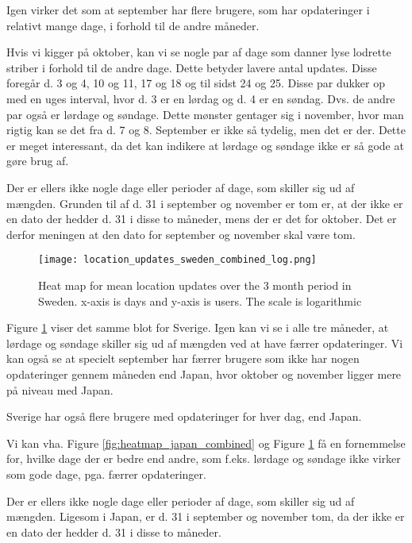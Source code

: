 Igen virker det som at september har flere brugere, som har opdateringer i relativt mange dage, i forhold til de andre måneder.

Hvis vi kigger på oktober, kan vi se nogle par af dage som danner lyse lodrette striber i forhold til de andre dage. Dette betyder lavere antal updates. Disse foregår d. 3 og 4, 10 og 11, 17 og 18 og til sidst 24 og 25. Disse par dukker op med en uges interval, hvor d. 3 er en lørdag og d. 4 er en søndag. Dvs. de andre par også er lørdage og søndage. Dette mønster gentager sig i november, hvor man rigtig kan se det fra d. 7 og 8. September er ikke så tydelig, men det er der. Dette er meget interessant, da det kan indikere at lørdage og søndage ikke er så gode at gøre brug af. 

Der er ellers ikke nogle dage eller perioder af dage, som skiller sig ud af mængden. Grunden til af d. 31 i september og november er tom er, at der ikke er en dato der hedder d. 31 i disse to måneder, mens der er det for oktober. Det er derfor meningen at den dato for september og november skal være tom. 

\begin{figure}[H]
    \hspace*{-1.5cm}
    \centering
    \texttt{[image: location\_updates\_sweden\_combined\_log.png]}
    \caption{Heat map for mean location updates over the 3 month period in Sweden. x-axis is days and y-axis is users. The scale is logarithmic}
    \label{fig:heatmap_sweden_combined}
\end{figure}
Figure \ref{fig:heatmap_sweden_combined} viser det samme blot for Sverige. Igen kan vi se i alle tre måneder, at lørdage og søndage skiller sig ud af mængden ved at have færrer opdateringer.  Vi kan også se at specielt september har færrer brugere som ikke har nogen opdateringer gennem måneden end Japan, hvor oktober og november ligger mere på niveau med Japan. 

Sverige har også flere brugere med opdateringer for hver dag, end Japan. 

Vi kan vha. Figure \ref{fig:heatmap_japan_combined} og Figure \ref{fig:heatmap_sweden_combined} få en fornemmelse for, hvilke dage der er bedre end andre, som f.eks. lørdage og søndage ikke virker som gode dage, pga. færrer opdateringer. 

Der er ellers ikke nogle dage eller perioder af dage, som skiller sig ud af mængden. Ligesom i Japan, er d. 31 i september og november tom, da der ikke er en dato der hedder d. 31 i disse to måneder. 

